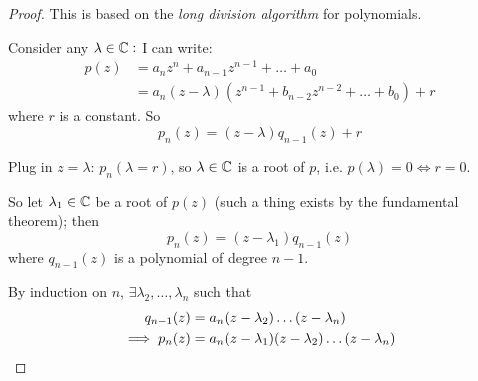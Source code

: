 \documentclass[10pt]{scrartcl}
\begin{document}
\begin{proof}
	This is based on the \emph{long division algorithm} for polynomials. 
	
	Consider any $\lambda \in\mathbb{C}:$ I can write: 
	\[
\begin{aligned}
  p(z) &= a_nz^n + a_{n-1}z^{n-1} + \dots + a_0\\
  &= a_n (z-\lambda)(z^{n-1} + b_{n-2}z^{n-2} + \dots + b_0) + r
\end{aligned}
\]
where $r$ is a constant. So 
\[p_n(z) = (z-\lambda)q_{n-1}(z) + r\]

Plug in $z = \lambda$: $p_n(\lambda = r)$, so $\lambda \in\mathbb{C}$ is a root of $p$, i.e. $p(\lambda)  = 0 \iff r = 0$. 

So let $\lambda_1 \in\mathbb{C}$ be a root of $p(z)$ (such a thing exists by the fundamental theorem); then 
\[p_n(z) = (z-\lambda_1)q_{n-1}(z)\]
where $q_{n-1}(z)$ is a polynomial of degree $n-1$. 

By induction on $n$, $\exists \lambda_2,\dots,\lambda_n$ such that 
\begin{align*}
  q_{n-1}(z) &= a_n(z-\lambda_2)\dots(z-\lambda_n)\\
  \implies p_n(z) &= a_n(z-\lambda_1)(z-\lambda_2)\dots(z-\lambda_n)\qedhere
\end{align*}
\end{proof}\vspace*{10pt}
\end{document}
